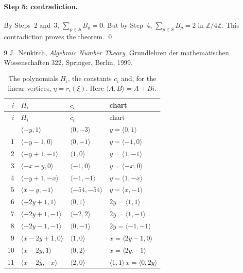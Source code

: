 \documentclass[11pt]{article}
\newcommand{\Z}{\mathbb{Z}}
\begin{document}
\paragraph{Step 5: contradiction.} By Steps~2 and~3, $\sum_{p\in S}B_p=0$. But by Step~4, $\sum_{p\in S}B_p=2$ in $\Z/4\Z$. This contradiction proves the theorem.
\qed


\begin{thebibliography}{9}
 J.~Neukirch, \emph{Algebraic Number Theory}, Grundlehren der mathematischen Wissenschaften 322, Springer, Berlin, 1999.
\end{thebibliography}

\clearpage
\begingroup\small
\setlength{\LTcapwidth}{\textwidth}
\begin{longtable}{@{}rlll@{}}
\caption{The polynomials $H_i$, the constants $c_i$ and, for the linear vertices, $\eta=r_i(\xi)$. Here $\langle A,B\rangle=A+Bi$.}\label{tab:vert1}\\
\hline $i$ & $H_i$ & $c_i$ & chart\\\hline\endfirsthead\hline $i$ & $H_i$ & $c_i$ & chart\\\hline\endhead\hline\endfoot
0 & $\langle -y,1\rangle$ & $\langle 0,-3\rangle$ & $y=\langle 0,1\rangle$\\
1 & $\langle -y-1,0\rangle$ & $\langle 0,-1\rangle$ & $y=\langle -1,0\rangle$\\
2 & $\langle -y+1,-1\rangle$ & $\langle 1,0\rangle$ & $y=\langle 1,-1\rangle$\\
3 & $\langle -x-y,0\rangle$ & $\langle -1,0\rangle$ & $y=\langle -x,0\rangle$\\
4 & $\langle -y+1,-x\rangle$ & $\langle -1,-1\rangle$ & $y=\langle 1,-x\rangle$\\
5 & $\langle x-y,-1\rangle$ & $\langle -54,-54\rangle$ & $y=\langle x,-1\rangle$\\
6 & $\langle -2y+1,1\rangle$ & $\langle 0,1\rangle$ & $2y=\langle 1,1\rangle$\\
7 & $\langle -2y+1,-1\rangle$ & $\langle -2,2\rangle$ & $2y=\langle 1,-1\rangle$\\
8 & $\langle -2y-1,-1\rangle$ & $\langle 0,-1\rangle$ & $2y=\langle -1,-1\rangle$\\
9 & $\langle x-2y+1,0\rangle$ & $\langle 1,0\rangle$ & $x=\langle 2y-1,0\rangle$\\
10 & $\langle x-2y,1\rangle$ & $\langle 0,2\rangle$ & $x=\langle 2y,-1\rangle$\\
11 & $\langle x-2y,-x\rangle$ & $\langle 2,0\rangle$ & $\langle 1,1\rangle\,x=\langle 0,2y\rangle$\\

\end{longtable}
\end{document}
